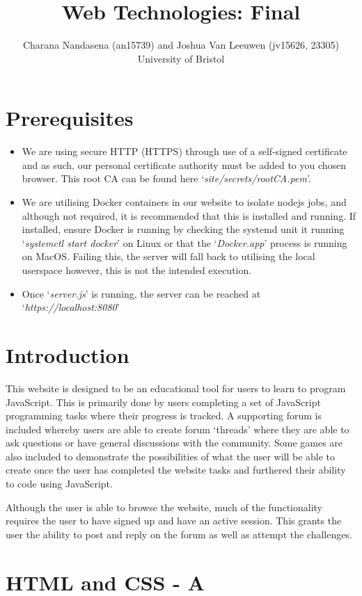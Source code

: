 \documentclass[a4paper]{article}
\title{Web Technologies: Final}
\author{Charana Nandasena (an15739) and Joshua Van Leeuwen (jv15626, 23305) University of Bristol}
\begin{document}
\maketitle

\section{Prerequisites}
\begin{itemize}
  \item{We are using secure HTTP (HTTPS) through use of a self-signed certificate and as
    such, our personal certificate authority must be added to you chosen
    browser. This root CA can be found here `\textit{site/secrets/rootCA.pem}'.}
  \item{We are utilising Docker containers in our website to isolate nodejs
    jobs, and although not required, it is recommended that this is installed
    and running. If installed, ensure Docker is running by checking the
    systemd unit it running `\textit{systemctl start docker}' on Linux or that the
    `\textit{Docker.app}' process is running on MacOS. Failing this, the server
    will fall back to utilising the local userspace however, this is not the
    intended execution.}
  \item{Once `\textit{server.js}' is running, the server can be reached at
    `\textit{https://localhost:8080}'}
\end{itemize}

\section {Introduction}
This website is designed to be an educational tool for users to learn to program
JavaScript. This is primarily done by users completing a set of JavaScript
programming tasks where their progress is tracked. A supporting forum is
included whereby users are able to create forum `threads' where they are able to
ask questions or have general discussions with the community. Some games are
also included to demonstrate the possibilities of what the user will be able to
create once the user has completed the website tasks and furthered their ability
to code using JavaScript.

Although the user is able to browse the website, much of the functionality
requires the user to have signed up and have an active session. This grants the
user the ability to post and reply on the forum as well as attempt the
challenges.

\section {HTML and CSS - A}
\end{document}
